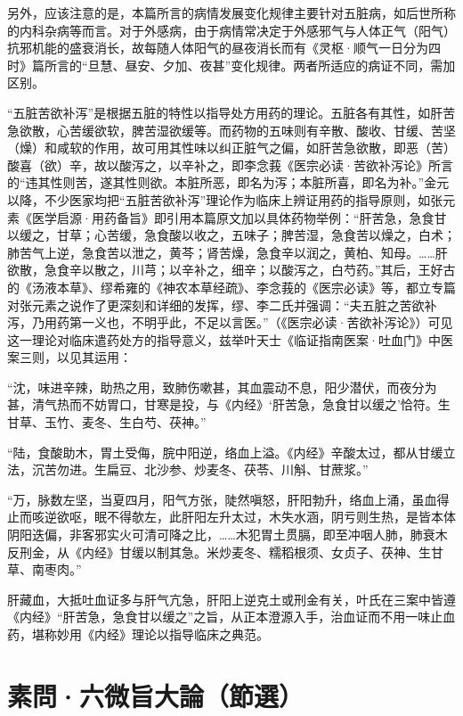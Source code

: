 \documentclass[12pt]{ctexbook}
\begin{document}
另外，应该注意的是，本篇所言的病情发展变化规律主要针对五脏病，如后世所称的内科杂病等而言。对于外感病，由于病情常决定于外感邪气与人体正气（阳气）抗邪机能的盛衰消长，故每随人体阳气的昼夜消长而有《灵枢·顺气一日分为四时》篇所言的“旦慧、昼安、夕加、夜甚”变化规律。两者所适应的病证不同，需加区别。



“五脏苦欲补泻”是根据五脏的特性以指导处方用药的理论。五脏各有其性，如肝苦急欲散，心苦缓欲软，脾苦湿欲缓等。而药物的五味则有辛散、酸收、甘缓、苦坚（燥）和咸软的作用，故可用其性味以纠正脏气之偏，如肝苦急欲散，即恶（苦）酸喜（欲）辛，故以酸泻之，以辛补之，即李念莪《医宗必读·苦欲补泻论》所言的“违其性则苦，遂其性则欲。本脏所恶，即名为泻；本脏所喜，即名为补。”金元以降，不少医家均把“五脏苦欲补泻”理论作为临床上辨证用药的指导原则，如张元素《医学启源·用药备旨》即引用本篇原文加以具体药物举例：“肝苦急，急食甘以缓之，甘草；心苦缓，急食酸以收之，五味子；脾苦湿，急食苦以燥之，白术；肺苦气上逆，急食苦以泄之，黄芩；肾苦燥，急食辛以润之，黄柏、知母。……肝欲散，急食辛以散之，川芎；以辛补之，细辛；以酸泻之，白芍药。”其后，王好古的《汤液本草》、缪希雍的《神农本草经疏》、李念莪的《医宗必读》等，都立专篇对张元素之说作了更深刻和详细的发挥，缪、李二氏并强调：“夫五脏之苦欲补泻，乃用药第一义也，不明乎此，不足以言医。”（《医宗必读·苦欲补泻论》）可见这一理论对临床遣药处方的指导意义，兹举叶天士《临证指南医案·吐血门》中医案三则，以见其运用：

“沈，味进辛辣，助热之用，致肺伤嗽甚，其血震动不息，阳少潜伏，而夜分为甚，清气热而不妨胃口，甘寒是投，与《内经》‘肝苦急，急食甘以缓之’恰符。生甘草、玉竹、麦冬、生白芍、茯神。”

“陆，食酸助木，胃土受侮，脘中阳逆，络血上溢。《内经》辛酸太过，都从甘缓立法，沉苦勿进。生扁豆、北沙参、炒麦冬、茯苓、川斛、甘蔗浆。”

“万，脉数左坚，当夏四月，阳气方张，陡然嗔怒，肝阳勃升，络血上涌，虽血得止而咳逆欲呕，眠不得欹左，此肝阳左升太过，木失水涵，阴亏则生热，是皆本体阴阳迭偏，非客邪实火可清可降之比，……木犯胃土贯膈，即至冲咽人肺，肺衰木反刑金，从《内经》甘缓以制其急。米炒麦冬、糯稻根须、女贞子、茯神、生甘草、南枣肉。”

肝藏血，大抵吐血证多与肝气亢急，肝阳上逆克土或刑金有关，叶氏在三案中皆遵《内经》“肝苦急，急食甘以缓之”之旨，从正本澄源入手，治血证而不用一味止血药，堪称妙用《内经》理论以指导临床之典范。

\section{素問·六微旨大論（節選）}%
\end{document}

